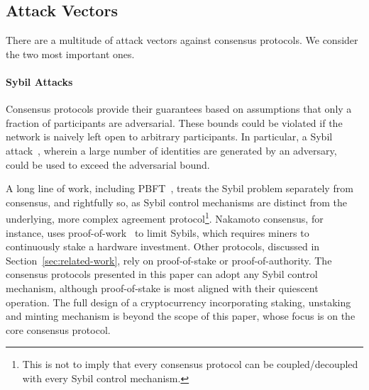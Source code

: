 \documentclass[letterpaper,twocolumn,10pt]{article}
\theoremstyle{definition}
\begin{document}


\subsection{Attack Vectors}
\label{sec:attack}
There are a multitude of attack vectors against consensus protocols.  
We consider the two most important ones.
\paragraph{Sybil Attacks}
Consensus protocols provide their guarantees based on assumptions that only a fraction of participants are adversarial.
These bounds could be violated if the network is naively left open to arbitrary participants.
In particular, a Sybil attack~\cite{douceur2002sybil}, wherein a large number of identities are generated by an adversary, could be used to exceed the adversarial bound.

A long line of work, including PBFT~\cite{castro1999practical}, treats the Sybil problem separately from consensus, and rightfully so, as Sybil control mechanisms are distinct from the underlying, more complex agreement protocol\footnote{This is not to imply that every consensus protocol can be coupled/decoupled with every Sybil control mechanism.}.
Nakamoto consensus, for instance, uses proof-of-work~\cite{aspnes2005exposing} to limit Sybils, which requires miners to continuously stake a hardware investment.
Other protocols, discussed in Section~\ref{sec:related-work}, rely on proof-of-stake or proof-of-authority.
The consensus protocols presented in this paper can adopt any
Sybil control mechanism, although proof-of-stake is most aligned with their quiescent operation.
The full design of a cryptocurrency incorporating staking, unstaking and minting mechanism is beyond the scope of this paper, whose focus is on the core consensus protocol.

\end{document}

